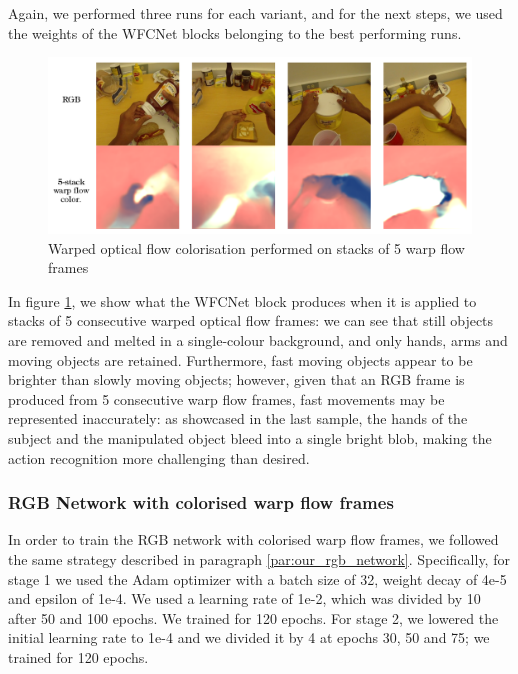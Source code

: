 \documentclass[10pt,twocolumn,letterpaper]{article}
\begin{document}
Again, we performed three runs for each variant, and for the next steps, we used the weights of the WFCNet blocks belonging to the best performing runs.

\begin{figure}
	\begin{center}
		\includegraphics[width=\linewidth]{grafici/wfcnet_color_img.pdf}		
	\end{center}
	\caption{Warped optical flow colorisation performed on stacks of 5 warp flow frames}
	\label{fig:wfcnet_color_img}
\end{figure}

In figure \ref{fig:wfcnet_color_img}, we show what the WFCNet block produces when it is applied to stacks of 5 consecutive warped optical flow frames: we can see that still objects are removed and melted in a single-colour background, and only hands, arms and moving objects are retained. Furthermore, fast moving objects appear to be brighter than slowly moving objects; however, given that an RGB frame is produced from 5 consecutive warp flow frames, fast movements may be represented inaccurately: as showcased in the last sample, the hands of the subject and the manipulated object bleed into a single bright blob, making the action recognition more challenging than desired.

\subsubsection{RGB Network with colorised warp flow frames}

In order to train the RGB network with colorised warp flow frames, we followed the same strategy described in paragraph \ref{par:our_rgb_network}. Specifically, for stage 1 we used the Adam optimizer with a batch size of 32, weight decay of 4e-5 and epsilon of 1e-4.  We used a learning rate of 1e-2, which was divided by 10 after 50 and 100 epochs. We trained for 120 epochs. For stage 2, we lowered the initial learning rate to 1e-4 and we divided it by 4 at epochs 30, 50 and 75; we trained for 120 epochs.
\end{document}

